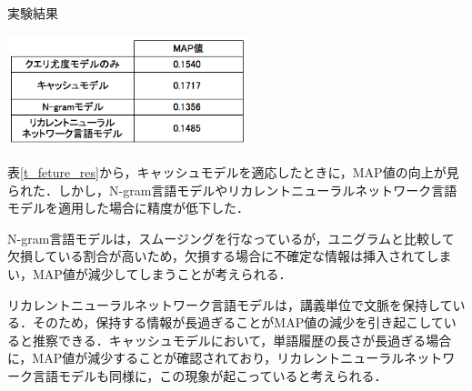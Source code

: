 \begin{table}[h]
    \centering
    \caption{実験結果}
    \includegraphics[width=7cm]{./image/t_feature2.png}
    \label{t_feture_res}
\end{table}

表\ref{t_feture_res}から，キャッシュモデルを適応したときに，MAP値の向上が見られた．しかし，N-gram言語モデルやリカレントニューラルネットワーク言語モデルを適用した場合に精度が低下した． 

N-gram言語モデルは，スムージングを行なっているが，ユニグラムと比較して欠損している割合が高いため，欠損する場合に不確定な情報は挿入されてしまい，MAP値が減少してしまうことが考えられる．

リカレントニューラルネットワーク言語モデルは，講義単位で文脈を保持している．そのため，保持する情報が長過ぎることがMAP値の減少を引き起こしていると推察できる．キャッシュモデルにおいて，単語履歴の長さが長過ぎる場合に，MAP値が減少することが確認されており，リカレントニューラルネットワーク言語モデルも同様に，この現象が起こっていると考えられる．